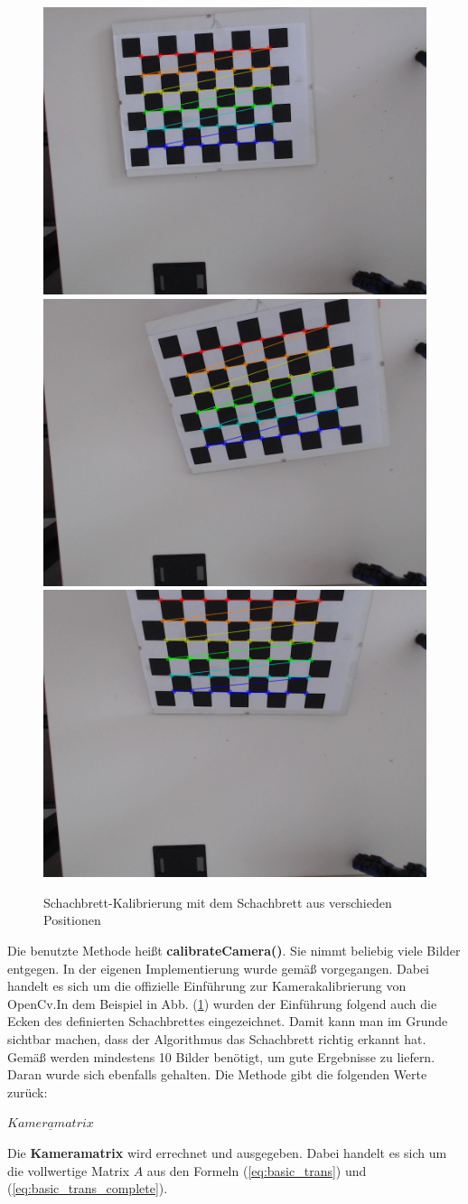 		\begin{figure}[h]
			\centering
			\includegraphics[width=0.32\linewidth]{img/hauptteil/calibration/chessboard_corner_0.png}
			\includegraphics[width=0.32\linewidth]{img/hauptteil/calibration/chessboard_corner_1.png}
			\includegraphics[width=0.32\linewidth]{img/hauptteil/calibration/chessboard_corner_2.png}
			\caption[Schachbrett-Kalibrierung]{Schachbrett-Kalibrierung mit dem Schachbrett aus verschieden Positionen}
			\label{fig:chessboards}
		\end{figure}
	
		Die benutzte Methode heißt \textbf{calibrateCamera()}. Sie nimmt beliebig viele Bilder entgegen. In der eigenen Implementierung wurde gemäß \citep{noauthor_opencv_nodate-1} vorgegangen. Dabei handelt es sich um die offizielle Einführung zur Kamerakalibrierung von OpenCv.In dem Beispiel in Abb. (\ref{fig:chessboards}) wurden der Einführung folgend auch die Ecken des definierten Schachbrettes eingezeichnet. Damit kann man im Grunde sichtbar machen, dass der Algorithmus das Schachbrett richtig erkannt hat. Gemäß \citep{noauthor_opencv_nodate-1} werden mindestens 10 Bilder benötigt, um gute Ergebnisse zu liefern. Daran wurde sich ebenfalls gehalten. Die Methode gibt die folgenden Werte zurück:
		
		$\underline{Kameramatrix}$
		
		Die \textbf{Kameramatrix} wird errechnet und ausgegeben. Dabei handelt es sich um die vollwertige Matrix \( A \) aus den Formeln (\ref{eq:basic_trans}) und (\ref{eq:basic_trans_complete}).
		
